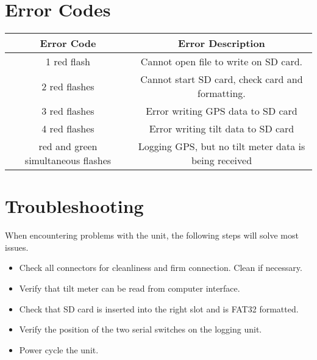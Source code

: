 \documentclass[11pt]{article} %
\begin{document}
\section{Error Codes}

\begin{center}
    \begin{tabular}{ |c|c|}
    \hline
    Error Code & Error Description\\
    \hline
    1 red flash &  Cannot open file to write on SD card.\\
    \hline
    2 red flashes &  Cannot start SD card, check card and formatting.\\
    \hline
    3 red flashes &  Error writing GPS data to SD card\\
    \hline
    4 red flashes &  Error writing tilt data to SD card\\
    \hline
    red and green simultaneous flashes &  Logging GPS, but no tilt meter data is being received\\
    \hline
    \end{tabular}
\end{center}

\section{Troubleshooting}
When encountering problems with the unit, the following steps will solve most issues.

\begin{itemize}
\item Check all connectors for cleanliness and firm connection. Clean if necessary.
\item Verify that tilt meter can be read from computer interface.
\item Check that SD card is inserted into the right slot and is FAT32 formatted.
\item Verify the position of the two serial switches on the logging unit.
\item Power cycle the unit.
\end{itemize}
\end{document}
